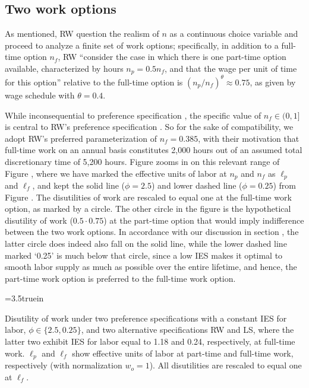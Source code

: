 \subsection{Two work options}

As mentioned, RW question the realism of $n$ as a continuous
choice variable and proceed to analyze a finite set of work
options; specifically, in addition to a full-time option $n_f$, 
RW ``consider the case in which there is one part-time option 
available, characterized by hours $n_p = 0.5 n_f$, and that the 
wage per unit of time for this option'' relative to the full-time 
option is $(n_p/n_f)^\theta \approx 0.75$, as given by wage
schedule  with $\theta=0.4$. 

While inconsequential to preference specification ,
the specific value of $n_f\in (0,1]$ is central to RW's preference
specification . So for the sake of compatibility, we
adopt RW's preferred parameterization of $n_f = 0.385$, with their
motivation that full-time work on an annual basis constitutes 2,000
hours out of an assumed total discretionary time of 5,200 hours.
Figure  zooms in on this relevant range of 
Figure , where we have marked the effective units of 
labor at $n_p$ and $n_f$ as $\ell_p$ and $\ell_f$, and kept the 
solid line ($\phi=2.5$) and lower dashed line ($\phi=0.25$) from
Figure . The disutilities of work are rescaled to
equal one at the full-time work option, as marked by a circle.
The other circle in the figure is the hypothetical disutility of 
work ($0.5 \cdot 0.75$) at the part-time option that would imply
indifference between the two work options. In accordance with our
discussion in section , the latter circle
does indeed also fall on the solid line, while the lower dashed line 
marked `0.25' is much below that circle, since a low IES makes it 
optimal to smooth labor supply as much as possible over the entire
lifetime, and hence, the part-time work option is preferred to the
full-time work option. 


\centerline{\epsfxsize=3.5truein}
\caption{Disutility of work under two preference specifications
with a constant IES for labor, $\phi \in \{2.5, 0.25\}$,
and two alternative specifications RW and LS, where the
latter two exhibit IES for labor equal to 1.18 and 0.24, respectively,
at full-time work. $\ell_p$ and $\ell_f$ show effective units 
of labor at part-time and full-time work, respectively (with
normalization $w_o =1$). All disutilities are rescaled to equal 
one at $\ell_f$.} 
\endfigure


